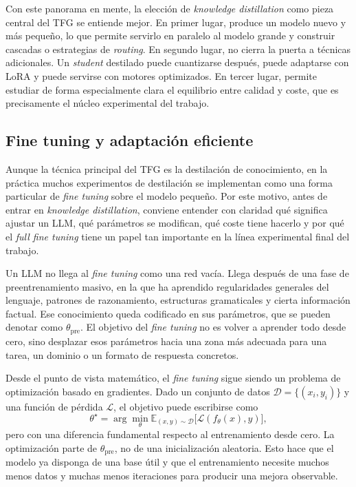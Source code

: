Con este panorama en mente, la elección de \textit{knowledge distillation} como pieza central del TFG se entiende mejor. En primer lugar, produce un modelo nuevo y más pequeño, lo que permite servirlo en paralelo al modelo grande y construir cascadas o estrategias de \textit{routing}. En segundo lugar, no cierra la puerta a técnicas adicionales. Un \textit{student} destilado puede cuantizarse después, puede adaptarse con LoRA y puede servirse con motores optimizados. En tercer lugar, permite estudiar de forma especialmente clara el equilibrio entre calidad y coste, que es precisamente el núcleo experimental del trabajo.

\subsection{Fine tuning y adaptación eficiente}

Aunque la técnica principal del TFG es la destilación de conocimiento, en la práctica muchos experimentos de destilación se implementan como una forma particular de \textit{fine tuning} sobre el modelo pequeño. Por este motivo, antes de entrar en \textit{knowledge distillation}, conviene entender con claridad qué significa ajustar un LLM, qué parámetros se modifican, qué coste tiene hacerlo y por qué el \textit{full fine tuning} tiene un papel tan importante en la línea experimental final del trabajo.

Un LLM no llega al \textit{fine tuning} como una red vacía. Llega después de una fase de preentrenamiento masivo, en la que ha aprendido regularidades generales del lenguaje, patrones de razonamiento, estructuras gramaticales y cierta información factual. Ese conocimiento queda codificado en sus parámetros, que se pueden denotar como $\theta_{\mathrm{pre}}$. El objetivo del \textit{fine tuning} no es volver a aprender todo desde cero, sino desplazar esos parámetros hacia una zona más adecuada para una tarea, un dominio o un formato de respuesta concretos.

Desde el punto de vista matemático, el \textit{fine tuning} sigue siendo un problema de optimización basado en gradientes. Dado un conjunto de datos $\mathcal{D} = \{(x_i,y_i)\}$ y una función de pérdida $\mathcal{L}$, el objetivo puede escribirse como
\[
\theta^\star
=
\arg\min_{\theta}
\mathbb{E}_{(x,y)\sim \mathcal{D}}
\big[
\mathcal{L}(f_\theta(x),y)
\big],
\]
pero con una diferencia fundamental respecto al entrenamiento desde cero. La optimización parte de $\theta_{\mathrm{pre}}$, no de una inicialización aleatoria. Esto hace que el modelo ya disponga de una base útil y que el entrenamiento necesite muchos menos datos y muchas menos iteraciones para producir una mejora observable.

